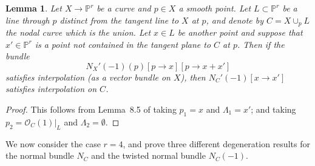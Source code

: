 \documentclass[11pt]{amsart}
\newcommand{\pp}{\mathbb{P}}
\renewcommand{\O}{\mathcal{O}}
\newtheorem{lem}[thm]{Lemma}
\theoremstyle{definition}
\theoremstyle{remark}
\begin{document}
\begin{lem} \label{1-secant}
Let $X \to \pp^r$ be a curve and $p \in X$ a smooth point.  Let $L \subset \pp^r$ be a line through $p$ distinct from the tangent line to $X$ at $p$,
and denote by $C = X \cup_p L$ the nodal curve which is the union.  Let $x \in L$ be another point and suppose that $x' \in \pp^r$ is a point not contained
in the tangent plane to $C$ at $p$.  Then if the bundle 
\[N_X'(-1)(p)[p \to x][p \to x+x'] \]
satisfies interpolation (as a vector bundle on $X$), then $N_C'(-1)[x \to x']$ satisfies interpolation on $C$.
\end{lem}
\begin{proof}
This follows from Lemma~8.5 of \cite{joint}
taking $p_1 = x$ and $\Lambda_1 = x'$;
and taking $p_2 = \O_C(1)|_L$ and $\Lambda_2 = \emptyset$.
\end{proof}
%

We now consider the case $r = 4$,
and prove three different degeneration results for the normal bundle $N_C$ and the twisted normal bundle $N_C(-1)$.
\end{document}
